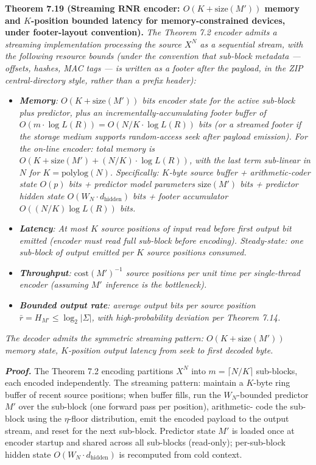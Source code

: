 \documentclass[
]{article}
\begin{document}
\textbf{Theorem 7.19 (Streaming RNR encoder: $O(K + \mathrm{size}(M'))$
memory and $K$-position bounded latency for memory-constrained devices,
under footer-layout convention).}
\emph{The Theorem 7.2 encoder admits a streaming implementation
processing the source $X^N$ as a sequential stream, with the following
resource bounds (under the convention that sub-block metadata --- offsets,
hashes, MAC tags --- is written as a \emph{footer} after the payload, in
the ZIP central-directory style, rather than a prefix header):}
\begin{itemize}
\item \emph{\textbf{Memory}: $O(K + \mathrm{size}(M'))$ bits encoder
state for the active sub-block plus predictor, \emph{plus} an
incrementally-accumulating footer buffer of $O(m \cdot \log L(R))
= O(N/K \cdot \log L(R))$ bits (or a streamed footer if the storage
medium supports random-access seek after payload emission).
For the on-line encoder: total memory is $O(K + \mathrm{size}(M') +
(N/K) \cdot \log L(R))$, with the last term sub-linear in $N$ for
$K = \mathrm{polylog}(N)$. Specifically: $K$-byte source buffer +
arithmetic-coder state $O(p)$ bits + predictor model parameters
$\mathrm{size}(M')$ bits + predictor hidden state
$O(W_N \cdot d_{\mathrm{hidden}})$ bits + footer accumulator
$O((N/K) \log L(R))$ bits.}
\item \emph{\textbf{Latency}: At most $K$ source positions of input
read before first output bit emitted (encoder must read full sub-block
before encoding). Steady-state: one sub-block of output emitted per
$K$ source positions consumed.}
\item \emph{\textbf{Throughput}: $\mathrm{cost}(M')^{-1}$ source
positions per unit time per single-thread encoder (assuming $M'$
inference is the bottleneck).}
\item \emph{\textbf{Bounded output rate}: average output bits per
source position $\bar{r} = H_{M'} \leq \log_2 |\Sigma|$, with
high-probability deviation per Theorem 7.14.}
\end{itemize}
\emph{The decoder admits the symmetric streaming pattern: $O(K +
\mathrm{size}(M'))$ memory state, $K$-position output latency from
seek to first decoded byte.}

\emph{\textbf{Proof.}} The Theorem 7.2 encoding partitions $X^N$ into
$m = \lceil N/K \rceil$ sub-blocks, each encoded independently.
The streaming pattern: maintain a $K$-byte ring buffer of recent
source positions; when buffer fills, run the $W_N$-bounded predictor
$M'$ over the sub-block (one forward pass per position), arithmetic-
code the sub-block using the $\eta$-floor distribution, emit the
encoded payload to the output stream, and reset for the next
sub-block. Predictor state $M'$ is loaded once at encoder startup
and shared across all sub-blocks (read-only); per-sub-block hidden
state $O(W_N \cdot d_{\mathrm{hidden}})$ is recomputed from cold
context.
\end{document}
